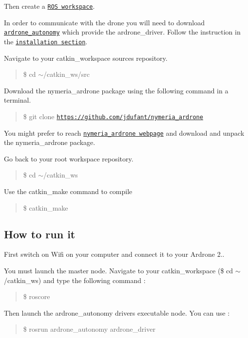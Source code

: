 Then create a \href{http://wiki.ros.org/ROS/Tutorials/InstallingandConfiguringROSEnvironment#Create_a_ROS_Workspace}{\tt R\+O\+S workspace}.

In order to communicate with the drone you will need to download \href{https://github.com/AutonomyLab/ardrone_autonomy}{\tt ardrone\+\_\+autonomy} which provide the ardrone\+\_\+driver. Follow the instruction in the \href{https://github.com/AutonomyLab/ardrone_autonomy#installation}{\tt installation section}.

Navigate to your catkin\+\_\+workspace sources repository. \begin{quote}
\$ cd $\sim$/catkin\+\_\+ws/src \end{quote}


Download the nymeria\+\_\+ardrone package using the following command in a terminal. \begin{quote}
\$ git clone \href{https://github.com/jdufant/nymeria_ardrone}{\tt https\+://github.\+com/jdufant/nymeria\+\_\+ardrone} \end{quote}


You might prefer to reach \href{https://github.com/jdufant/nymeria_ardrone}{\tt nymeria\+\_\+ardrone webpage} and download and unpack the nymeria\+\_\+ardrone package.

Go back to your root workspace repository. \begin{quote}
\$ cd $\sim$/catkin\+\_\+ws \end{quote}


Use the catkin\+\_\+make command to compile \begin{quote}
\$ catkin\+\_\+make \end{quote}


\subsection*{How to run it}

First switch on Wifi on your computer and connect it to your Ardrone 2..

You must launch the master node. Navigate to your catkin\+\_\+workspace ({\ttfamily \$ cd $\sim$/catkin\+\_\+ws}) and type the following command \+: \begin{quote}
\$ roscore \end{quote}


Then launch the ardrone\+\_\+autonomy driver\textquotesingle{}s executable node. You can use \+: \begin{quote}
\$ rosrun ardrone\+\_\+autonomy ardrone\+\_\+driver \end{quote}


